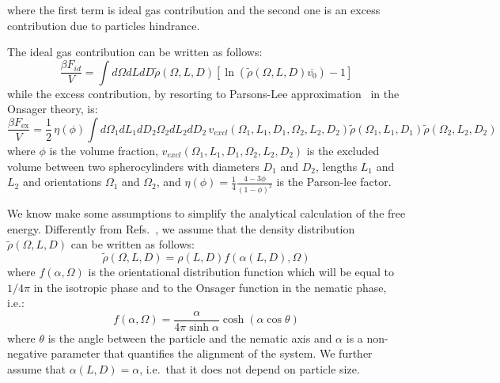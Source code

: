 \documentclass[journal=jacsat,manuscript=article]{achemso}
\begin{document}
where the first term is ideal gas contribution and the second one is an excess contribution due to particles hindrance.



The ideal gas contribution can be written as follows:
\begin{equation}
  \frac{\beta F_{id}}{V} = \int d\Omega dL dD\tilde{\rho}(\Omega,L,D) \left [\ln(\tilde{\rho}(\Omega,L,D) \overline{v_0}) - 1 \right]
\end{equation}
while the excess contribution, by resorting to Parsons-Lee approximation~\cite{Parson} in the Onsager theory, is: 
\begin{equation}
\frac{\beta F_\mathrm{ex}}{V} = \frac{1}{2} \, \eta(\phi) 
 \int d\Omega_1 dL_1 dD_2\Omega_2 dL_2 dD_2 \, v_{excl}(\Omega_1,L_1,D_1,\Omega_2,L_2,D_2) \tilde\rho(\Omega_1,L_1,D_1) 
  \tilde\rho(\Omega_2,L_2,D_2)
\end{equation}
where $\phi$ is the volume fraction, $v_{excl}(\Omega_1,L_1,D_1,\Omega_2,L_2,D_2)$ 
is the excluded volume between two spherocylinders with diameters $D_1$
and $D_2$, lengths $L_1$ and $L_2$ and orientations $\Omega_1$ and $\Omega_2$, and
$\eta(\phi) = \frac{1}{4} \frac{4 - 3\phi}{(1 - \phi)^2}$ is the Parson-lee factor.

We know make some assumptions to simplify the analytical calculation of the free energy.
Differently from Refs.~\cite{Speranza2002,Wensink2003}, we assume that the density distribution
$\tilde\rho(\Omega,L,D)$ can be written as follows:
\begin{equation}
\tilde\rho(\Omega, L, D) = \rho(L,D) f(\alpha(L,D), \Omega)
\end{equation}
where $f(\alpha,\Omega)$ is the orientational distribution function which will be equal to $1/4\pi$ in the isotropic phase and 
to the Onsager function in the nematic phase, i.e.:
\begin{equation}\label{eq:Fons}
   f(\alpha,\Omega) = \frac{\alpha}{4 \pi \sinh \alpha} \cosh(\alpha \cos \theta)
\end{equation}
where $\theta$ is the angle between the particle and the nematic axis and $\alpha$ is a non-negative parameter that quantifies the alignment of the system.
We further assume that $\alpha(L,D)=\alpha$, i.e.~that it does not depend on particle size.
\end{document}
